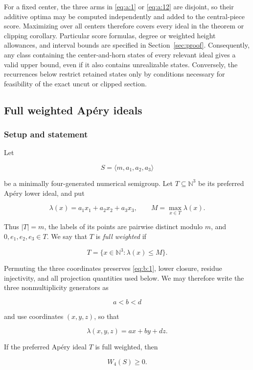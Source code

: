 For a fixed center, the three arms in \eqref{eq:a:1} or \eqref{eq:a:12} are disjoint, so their
additive optima may be computed independently and added to the central-piece
score. Maximizing over all centers therefore covers every ideal in the
theorem or clipping corollary. Particular score formulas, degree or weighted
height allowances, and interval bounds are specified in Section~\ref{sec:proof}.
Consequently, any class containing the center-and-horn states of every
relevant ideal gives a valid upper bound, even if it also contains
unrealizable states. Conversely, the recurrences below restrict retained
states only by conditions necessary for feasibility of the exact uncut or
clipped section.


\subsection{Full weighted Apéry ideals}\label{sec:analytic-b}


\subsubsection{Setup and statement}

Let

\[
S=\langle m,a_1,a_2,a_3\rangle
\]

be a minimally four-generated numerical semigroup. Let
\(T\subseteq\mathbb N^3\) be its preferred Apéry lower ideal, and put

\[
\lambda(x)=a_1x_1+a_2x_2+a_3x_3,
\qquad
M=\max_{x\in T}\lambda(x).
\]

Thus \(|T|=m\), the labels of its points are pairwise distinct modulo
\(m\), and \(0,e_1,e_2,e_3\in T\). We say that \(T\) is \emph{full weighted} if

\begin{equation}
T=\{x\in\mathbb N^3:\lambda(x)\le M\}.
\label{eq:b:1}
\end{equation}

Permuting the three coordinates preserves \eqref{eq:b:1}, lower closure, residue
injectivity, and all projection quantities used below. We may therefore
write the three nonmultiplicity generators as

\[
a<b<d
\]

and use coordinates \((x,y,z)\), so that

\[
\lambda(x,y,z)=ax+by+dz.
\]

\begin{theorem}\label{theorem:b:1.1}

If the preferred Apéry ideal \(T\) is full weighted, then

\[
W_4(S)\ge0.
\]

\end{theorem}
